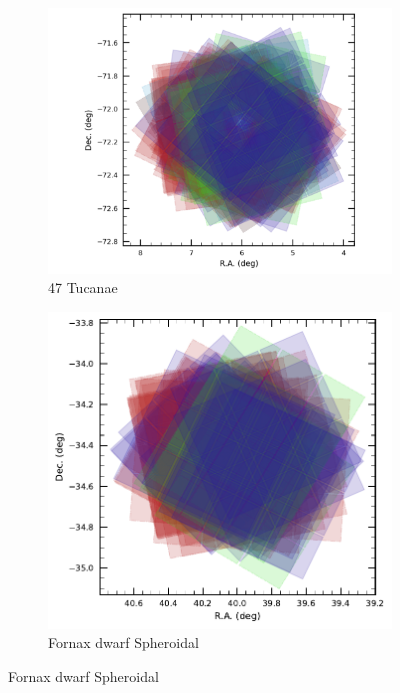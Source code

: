 \begin{figure}[ht]
    \centering
    \begin{subfigure}[b]{0.22\textwidth}
        \centering
        \includegraphics[width=\linewidth]{showVisit_DP1_47Tuc}
        \caption{47 Tucanae}
    \end{subfigure}\hfill
    \begin{subfigure}[b]{0.22\textwidth}
        \centering
        \includegraphics[width=\linewidth]{showVisit_DP1_Fornax_dSph}
        \caption{Fornax dwarf Spheroidal}

\end{subfigure}
\end{figure}
